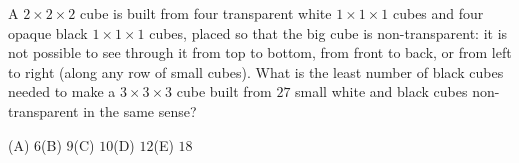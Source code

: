 A $2\times2\times2$ cube is built from four transparent white $1\times1\times1$ cubes and four opaque black $1\times1\times1$ cubes, placed so that the big cube is non-transparent: it is not possible to see through it from top to bottom, from front to back, or from left to right (along any row of small cubes). What is the least number of black cubes needed to make a $3\times3\times3$ cube built from $27$ small white and black cubes non-transparent in the same sense?

(A) $6$\quad (B) $9$\quad (C) $10$\quad (D) $12$\quad (E) $18$
